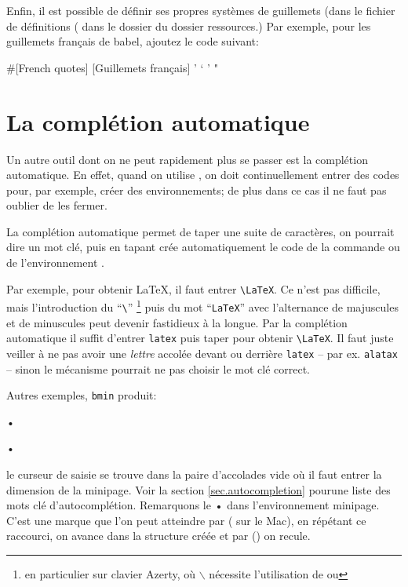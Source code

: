 Enfin, il est possible de définir ses propres systèmes de guillemets (dans le fichier de définitions ( dans le dossier  du dossier ressources.) Par exemple, pour les guillemets français de babel, ajoutez le code suivant:
\begin{verbExample}
#[French quotes]
[Guillemets français]
'   `     '
"   \og{}    \fg{}
\end{verbExample}

\section{La complétion automatique}

Un autre outil dont on ne peut rapidement plus se passer est la complétion automatique. En effet, quand on utilise \AllTeX, on doit continuellement entrer des codes pour, par exemple, créer des environnements; de plus dans ce cas il ne faut pas oublier de les fermer.

La complétion automatique permet de taper une suite de caractères, on pourrait dire un mot clé, puis en tapant  \Tw{} crée automatiquement le code de la commande ou de l'environnement \AllTeX.

Par exemple, pour obtenir \og\LaTeX\fg, il faut entrer \verb|\LaTeX|. Ce n'est pas difficile, mais l'introduction du ``\verb|\|'' \footnote{en particulier sur clavier Azerty, où $\backslash$ nécessite l'utilisation de  ou } puis du mot ``\verb|LaTeX|'' avec l'alternance de majuscules et de minuscules peut devenir fastidieux à la longue. Par la complétion automatique il suffit d'entrer \verb|latex| puis taper  pour obtenir \verb|\LaTeX|. Il faut juste veiller à ne pas avoir une \emph{lettre} accolée devant ou derrière \verb|latex| -- par ex. \verb|alatax| -- sinon le mécanisme pourrait ne pas choisir le mot clé correct.

Autres exemples, \verb|bmin| produit:
\begin{verbExample}
\begin{minipage}{}
•
\end{minipage}•
\end{verbExample}
le curseur de saisie se trouve dans la paire d'accolades vide où il faut entrer la dimension de la minipage. Voir la section \ref{sec.autocompletion} pourune liste des mots clé d'autocomplétion.
Remarquons le \og•\fg{} dans l'environnement minipage. C'est une marque que l'on peut atteindre par  ( sur le Mac), en répétant ce raccourci, on avance dans la structure créée et par  () on recule. 

